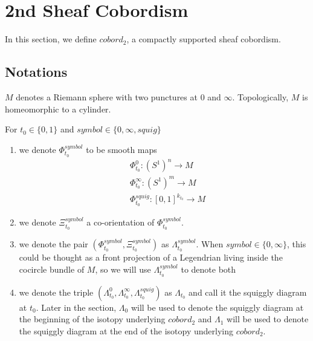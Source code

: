 \section{2nd Sheaf Cobordism}
In this section, we define $cobord_2$, a compactly supported sheaf cobordism.
\subsection{Notations}
\begin{definition}
$M$ denotes a Riemann sphere with two punctures at $0$ and $\infty$. Topologically, $M$ is homeomorphic to a cylinder.
\end{definition}
\begin{definition}
For $t_0\in\{0,1\}$ and $symbol\in\{0,\infty, squig \}$
\begin{enumerate}
\item we denote $\Phi_{t_0}^{symbol}$ to be smooth maps
\begin{align*}
&\Phi_{t_0}^0 : (S^1)^n \rightarrow M \\
&\Phi_{t_0}^\infty : (S^1)^m \rightarrow M \\
&\Phi_{t_0}^{squig} : [0,1]^{k_{t_0}} \rightarrow M
\end{align*}

\item we denote $\Xi_{t_0}^{symbol}$ a co-orientation of $\Phi_{t_0}^{symbol}$.

\item we denote the pair $(\Phi_{t_0}^{symbol},\Xi_{t_0}^{symbol})$ as $\Lambda_{t_0}^{symbol}$. When $symbol \in \{0,\infty\}$, this could be thought as a front projection of a Legendrian living inside the cocircle bundle of $M$, so we will use $\Lambda_{t_0}^{symbol}$ to denote both

\item we denote the triple $(\Lambda_{t_0}^{0},\Lambda_{t_0}^{\infty},\Lambda_{t_0}^{squig})$ as $\Lambda_{t_0}$ and call it the squiggly diagram at $t_0$. Later in the section, $\Lambda_0$ will be used to denote the squiggly diagram at the beginning of the isotopy underlying $cobord_2$ and $\Lambda_1$ will be used to denote the squiggly diagram at the end of the isotopy underlying $cobord_2$. 
\end{enumerate}
\end{definition}

